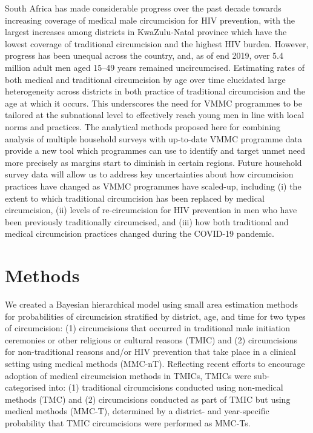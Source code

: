 \documentclass{article}
\begin{document}
South Africa has made considerable progress over the past decade towards increasing coverage of medical male circumcision for HIV prevention, with the largest increases among districts in KwaZulu-Natal province which have the lowest coverage of traditional circumcision and the highest HIV burden. However, progress has been unequal across the country, and, as of end 2019, over 5.4 million adult men aged 15--49 years remained uncircumcised. Estimating rates of both medical and traditional circumcision by age over time elucidated large heterogeneity across districts in both practice of traditional circumcision and the age at which it occurs. This underscores the need for VMMC programmes to be tailored at the subnational level to effectively reach young men in line with local norms and practices. The analytical methods proposed here for combining analysis of multiple household surveys with up-to-date VMMC programme data provide a new tool which programmes can use to identify and target unmet need more precisely as margins start to diminish in certain regions. Future household survey data will allow us to address key uncertainties about how circumcision practices have changed as VMMC programmes have scaled-up, including (i) the extent to which traditional circumcision has been replaced by medical circumcision, (ii) levels of re-circumcision for HIV prevention in men who have been previously traditionally circumcised, and (iii) how both traditional and medical circumcision practices changed during the COVID-19 pandemic.


\newpage 

\section*{Methods}
\label{sec::methods}


We created a Bayesian hierarchical model using small area estimation methods for probabilities of circumcision stratified by district, age, and time for two types of circumcision: (1) circumcisions that occurred in traditional male initiation ceremonies or other religious or cultural reasons (TMIC) and (2) circumcisions for non-traditional reasons and/or HIV prevention that take place in a clinical setting using medical methods (MMC-nT). Reflecting recent efforts to encourage adoption of medical circumcision methods in TMICs, TMICs were sub-categorised into: (1) traditional circumcisions conducted using non-medical methods (TMC) and (2) circumcisions conducted as part of TMIC but using medical methods (MMC-T), determined by a district- and year-specific probability that TMIC circumcisions were performed as MMC-Ts.
\end{document}
